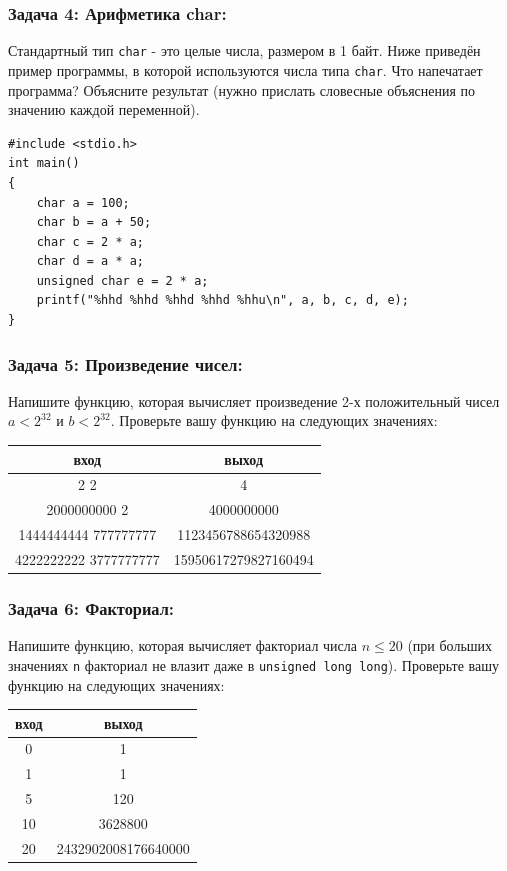 \documentclass{article}
\begin{document}
\subsubsection*{Задача 4: Арифметика char:}
Стандартный тип \texttt{char} - это целые числа, размером в 1 байт. Ниже приведён пример программы, в которой используются числа типа \texttt{char}. Что напечатает программа? Объясните результат (нужно прислать словесные объяснения по значению каждой переменной). 
\begin{lstlisting}
#include <stdio.h>
int main()
{
	char a = 100;
	char b = a + 50;
	char c = 2 * a;
	char d = a * a;
	unsigned char e = 2 * a;
	printf("%hhd %hhd %hhd %hhd %hhu\n", a, b, c, d, e);
}
\end{lstlisting}

\subsubsection*{Задача 5: Произведение чисел:} Напишите функцию, которая вычисляет произведение 2-х положительный чисел $a < 2^{32}$ и $b < 2^{32}$. Проверьте вашу функцию на следующих значениях:
\begin{center}
\begin{tabular}{ c c }
 вход & выход \\ \hline
 2 2 & 4  \\ 
 2000000000 2 & 4000000000  \\ 
 1444444444 777777777 & 1123456788654320988 \\ 
 4222222222 3777777777 & 15950617279827160494 \\   
\end{tabular}
\end{center}
\subsubsection*{Задача 6: Факториал:} Напишите функцию, которая вычисляет факториал числа $n \leq 20$ (при больших значениях \texttt{n} факториал не влазит даже в \texttt{unsigned long long}). Проверьте вашу функцию на следующих значениях:
\begin{center}
\begin{tabular}{ c c }
 вход & выход \\ \hline
 0 & 1  \\ 
 1 & 1 \\  
 5 & 120   \\  
 10 & 3628800   \\  
 20 & 2432902008176640000   \\  
\end{tabular}
\end{center}
\end{document}
